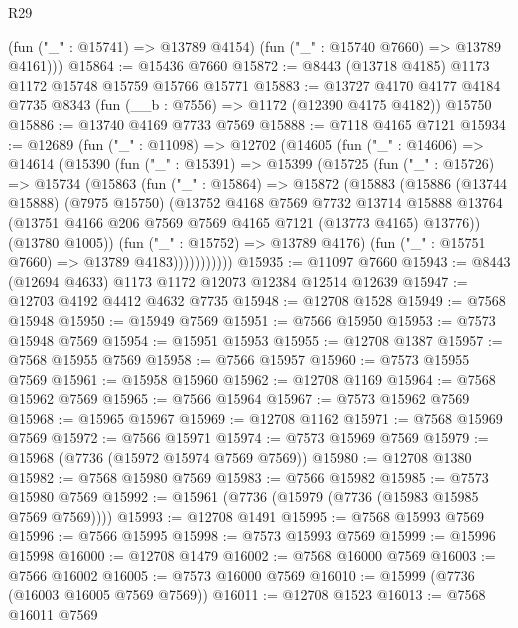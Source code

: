 \begin{lexlean}{R29}
\begin{coremodule}
        (fun ("_" : @15741) => @13789 @4154)
        (fun ("_" : @15740 @7660) => @13789 @4161)))
@15864 := @15436 @7660
@15872 := @8443 (@13718 @4185) @1173 @1172 @15748 @15759 @15766 @15771
@15883 := @13727
    @4170
    @4177
    @4184
    @7735
    @8343
    (fun (__b : @7556) => @1172 (@12390 @4175 @4182))
    @15750
@15886 := @13740 @4169 @7733 @7569
@15888 := @7118 @4165 @7121
@15934 := @12689
    (fun ("_" : @11098) =>
    @12702
      (@14605
        (fun ("_" : @14606) =>
        @14614
          (@15390
            (fun ("_" : @15391) =>
            @15399
              (@15725
                (fun ("_" : @15726) =>
                @15734
                  (@15863
                    (fun ("_" : @15864) =>
                    @15872
                      (@15883
                        (@15886
                          (@13744 @15888)
                          (@7975 @15750)
                          (@13752
                            @4168
                            @7569
                            @7732
                            @13714
                            @15888
                            @13764
                            (@13751 @4166 @206 @7569 @7569 @4165 @7121 (@13773 @4165) @13776))
                          (@13780 @1005))
                        (fun ("_" : @15752) => @13789 @4176)
                        (fun ("_" : @15751 @7660) => @13789 @4183)))))))))))
@15935 := @11097 @7660
@15943 := @8443 (@12694 @4633) @1173 @1172 @12073 @12384 @12514 @12639
@15947 := @12703 @4192 @4412 @4632 @7735
@15948 := @12708 @1528
@15949 := @7568 @15948
@15950 := @15949 @7569
@15951 := @7566 @15950
@15953 := @7573 @15948 @7569
@15954 := @15951 @15953
@15955 := @12708 @1387
@15957 := @7568 @15955 @7569
@15958 := @7566 @15957
@15960 := @7573 @15955 @7569
@15961 := @15958 @15960
@15962 := @12708 @1169
@15964 := @7568 @15962 @7569
@15965 := @7566 @15964
@15967 := @7573 @15962 @7569
@15968 := @15965 @15967
@15969 := @12708 @1162
@15971 := @7568 @15969 @7569
@15972 := @7566 @15971
@15974 := @7573 @15969 @7569
@15979 := @15968 (@7736 (@15972 @15974 @7569 @7569))
@15980 := @12708 @1380
@15982 := @7568 @15980 @7569
@15983 := @7566 @15982
@15985 := @7573 @15980 @7569
@15992 := @15961 (@7736 (@15979 (@7736 (@15983 @15985 @7569 @7569))))
@15993 := @12708 @1491
@15995 := @7568 @15993 @7569
@15996 := @7566 @15995
@15998 := @7573 @15993 @7569
@15999 := @15996 @15998
@16000 := @12708 @1479
@16002 := @7568 @16000 @7569
@16003 := @7566 @16002
@16005 := @7573 @16000 @7569
@16010 := @15999 (@7736 (@16003 @16005 @7569 @7569))
@16011 := @12708 @1523
@16013 := @7568 @16011 @7569

\end{coremodule}
\end{lexlean}
